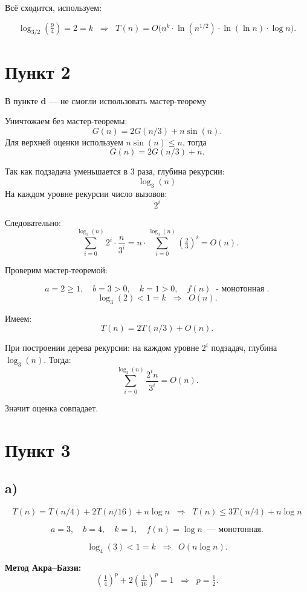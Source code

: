 \documentclass[12pt]{article}
\begin{document}
Всё сходится, используем:

\[
\log_{3/2}\!\left(\tfrac{9}{4}\right) = 2 = k \;\;\Rightarrow\;\; 
T(n) = O\!\Big(n^k \cdot \ln(n^{1/2}) \cdot \ln(\ln n) \cdot \log n\Big).
\]

\section*{Пункт 2}

В пункте \textbf{d}  — не смогли использовать мастер-теорему  

Уничтожаем без мастер-теоремы:  
\[
G(n) = 2G(n/3) + n\sin(n).
\]
Для верхней оценки используем $n\sin(n) \leq n$, тогда
\[
G(n) = 2G(n/3) + n.
\]

Так как подзадача уменьшается в 3 раза, глубина рекурсии:
\[
\log_3(n)
\]
На каждом уровне рекурсии число вызовов:
\[
2^i
\]

Следовательно:
\[
\sum_{i=0}^{\log_3(n)} 2^i \cdot \frac{n}{3^i}
= n \cdot \sum_{i=0}^{\log_3(n)} \left(\tfrac{2}{3}\right)^i
= O(n).
\]

\noindent Проверим мастер-теоремой:

\[
a = 2 \geq 1, \quad b = 3 > 0, \quad k = 1 > 0, \quad f(n) \;\;\text{- монотонная }.
\]
\[
\log_3(2) < 1 = k \;\;\Rightarrow\;\; O(n).
\]

Имеем:
\[
T(n) = 2T(n/3) + O(n).
\]

При построении дерева рекурсии: на каждом уровне $2^i$ подзадач, глубина $\log_3(n)$. Тогда:
\[
\sum_{i=0}^{\log_3(n)} \frac{2^i n}{3^i} = O(n).
\]

Значит оценка совпадает.

\section*{Пункт 3}

\subsection*{a)}
\[
T(n) = T(n/4) + 2T(n/16) + n\log n \;\;\Rightarrow\;\; 
T(n) \leq 3T(n/4) + n\log n
\]

\[
a=3, \quad b=4, \quad k=1, \quad f(n)=\log n \;\;\text{--- монотонная}.
\]

\[
\log_4(3) < 1 = k \;\;\Rightarrow\;\; O(n\log n).
\]

\textbf{Метод Акра–Баззи:}
\[
\left(\tfrac14\right)^p + 2\left(\tfrac{1}{16}\right)^p = 1 \;\;\Rightarrow\;\; p=\tfrac12.
\]
\end{document}
